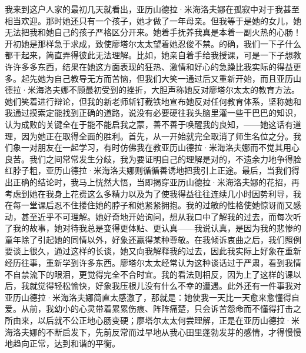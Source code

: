 \documentclass[12pt, UTF8]{ctexbook}
\begin{document}
\par 我来到这户人家的最初几天就看出，亚历山德拉·米海洛夫娜在孤寂中对于我甚至相当欢迎。那时她还只有一个孩子，她才做了一年母亲。但我等于是她的女儿，她无法把我和她自己的孩子严格区分开来。她着手抚养我真是本着一副火热的心肠！开初她是那样急于求成，致使廖塔尔太太望着她忍俊不禁。的确，我们一下子什么都干起来，简直弄得彼此无法理解。比如，她亲自着手给我授课，可是一下子想教许许多多东西，结果在她这方面表现的狂热、激情和好心的急躁比我实际的得益更多。起先她为自己教导无方而苦恼，但我们大笑一通过后又重新开始，而且亚历山德拉·米海洛夫娜不顾最初受到的挫折，大胆声称她反对廖塔尔太太的教育方法。她们笑着进行辩论，但我的新老师斩钉截铁地宣布她反对任何教育体系，坚称她和我通过摸索定能找到正确的道路，说没有必要硬往我头脑里灌一些干巴巴的知识，认为成败的关键全在于能不能启我之蒙，善不善于唤醒我的良知，——她这话有道理，因为她正在取得全面的胜利。首先，从一开始就完全取消了师生名位之分。我们象一对朋友在一起学习，有时仿佛我在教亚历山德拉·米海洛夫娜而不觉其用心良苦。我们之间常常发生分歧，我为要证明自己的理解是对的，不遗余力地争得脸红脖子粗，亚历山德拉·米海洛夫娜则循循善诱地把我引上正途。最后，当我们得出正确的结论时，我马上恍然大悟，当即揭穿亚历山德拉·米海洛夫娜的花招，再考虑到她在我身上花费这么多精力以及为了使我得益往往连续几小时因势利导，我在每一堂课后忍不住搂住她的脖子和她紧紧拥抱。我的过敏的性格使她惊讶而又感动，甚至近乎不可理解。她好奇地开始询问，想从我口中了解我的过去，而每次听了我的故事，她对待我总是变得更体贴、更认真——我说认真，是因为我的悲惨的童年除了引起她的同情以外，好象还赢得某种尊敬。在我倾诉衷曲之后，我们照例要谈上很久，通过这样的长谈，她又向我解释我的过去，因此我实际上好象在重新经历往事，重新学到许多东西。廖塔尔太太经常认为这种谈话过于严肃，看到我情不自禁流下的眼泪，更觉得完全不合时宜。我的看法则相反，因为上了这样的课以后，我就觉得轻松愉快，好象我压根儿没有什么不幸的遭遇。此外还有一件事我对亚历山德拉·米海洛夫娜简直太感激了，那就是：她使我一天比一天愈来愈懂得自爱。从前，我幼小的心灵带着累累伤痕、阵阵痛楚，只会诉苦怨命而不懂得打击之所由来，以后就不公正地心肠变硬；廖塔尔太太何尝理解，正是在亚历山德拉·米海洛夫娜的不断启发下，先前反常而过早地从我心田里蓬勃发芽的感情，才得慢慢地趋向正常，达到和谐的平衡。
\end{document}
